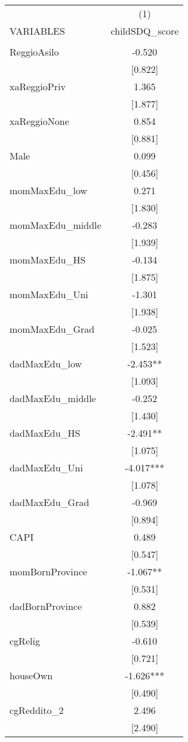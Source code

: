 \documentclass[]{article}
\begin{document}
\begin{tabular}{lc} \hline
 & (1) \\
VARIABLES & childSDQ\_score \\ \hline
 &  \\
ReggioAsilo & -0.520 \\
 & [0.822] \\
xaReggioPriv & 1.365 \\
 & [1.877] \\
xaReggioNone & 0.854 \\
 & [0.881] \\
Male & 0.099 \\
 & [0.456] \\
momMaxEdu\_low & 0.271 \\
 & [1.830] \\
momMaxEdu\_middle & -0.283 \\
 & [1.939] \\
momMaxEdu\_HS & -0.134 \\
 & [1.875] \\
momMaxEdu\_Uni & -1.301 \\
 & [1.938] \\
momMaxEdu\_Grad & -0.025 \\
 & [1.523] \\
dadMaxEdu\_low & -2.453** \\
 & [1.093] \\
dadMaxEdu\_middle & -0.252 \\
 & [1.430] \\
dadMaxEdu\_HS & -2.491** \\
 & [1.075] \\
dadMaxEdu\_Uni & -4.017*** \\
 & [1.078] \\
dadMaxEdu\_Grad & -0.969 \\
 & [0.894] \\
CAPI & 0.489 \\
 & [0.547] \\
momBornProvince & -1.067** \\
 & [0.531] \\
dadBornProvince & 0.882 \\
 & [0.539] \\
cgRelig & -0.610 \\
 & [0.721] \\
houseOwn & -1.626*** \\
 & [0.490] \\
cgReddito\_2 & 2.496 \\
 & [2.490] \\

\end{tabular}
\end{document}
